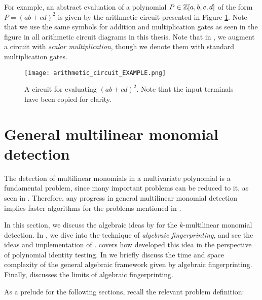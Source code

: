 For example, an abstract evaluation of a polynomial $P \in \mathbb Z[a,b,c,d]$ of the form 
$P = (ab+cd)^2$ is given by the arithmetic circuit presented in Figure \ref{fig:circuit_example}. 
Note that we use the same symbols for addition and multiplication gates as seen in the figure 
in all arithmetic circuit diagrams in this thesis. 
Note that in , we augment a circuit with \emph{scalar multiplication}, 
though we denote them with standard multiplication gates.

\begin{figure}[h]
  \texttt{[image: arithmetic\_circuit\_EXAMPLE.png]}
  \centering
  \caption{A circuit for evaluating $(ab+cd)^2$. 
  Note that the input terminals have been copied for clarity.}
  \label{fig:circuit_example}
\end{figure}

\FloatBarrier
\section{General multilinear monomial detection}
\label{sect:general_mld}

The detection of multilinear monomials in a multivariate polynomial is a fundamental problem, 
since many important problems can be reduced to it, 
as seen in . 
Therefore, any progress in general multilinear monomial detection implies 
faster algorithms for the problems mentioned in .

In this section, 
we discuss the algebraic ideas by \citeauthor{KouWil09} \cite{Koutis08, Williams09, KouWil09} 
for the $k$-multilinear monomial detection. 
In , 
we dive into the technique of \emph{algebraic fingerprinting}, and 
see the ideas and implementation of \textcite{Koutis08}. 
 covers how 
\textcite{Williams09} developed this idea  
in the perspective of polynomial identity testing. 
In  we briefly discuss the time and space complexity 
of the general algebraic framework given by algebraic fingerprinting. 
Finally,  discusses the limits of algebraic fingerprinting.

As a prelude for the following sections, recall the relevant problem definition: 
\begin{problem}
\end{problem}

